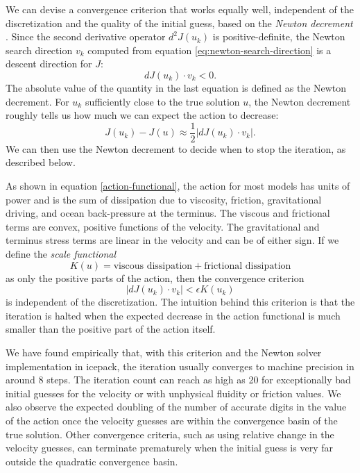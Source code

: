 \documentclass[journal abbreviation, manuscript]{copernicus}
\begin{document}
We can devise a convergence criterion that works equally well, independent of the discretization and the quality of the initial guess, based on the \emph{Newton decrement} \citep{nocedal2006numerical}.
Since the second derivative operator $d^2J(u_k)$ is positive-definite, the Newton search direction $v_k$ computed from equation \eqref{eq:newton-search-direction} is a descent direction for $J$:
\begin{equation}
    dJ(u_k)\cdot v_k < 0.
\end{equation}
The absolute value of the quantity in the last equation is defined as the Newton decrement.
For $u_k$ sufficiently close to the true solution $u$, the Newton decrement roughly tells us how much we can expect the action to decrease:
\begin{equation}
    J(u_k) - J(u) \approx \frac{1}{2}|dJ(u_k)\cdot v_k|.
\end{equation}
We can then use the Newton decrement to decide when to stop the iteration, as described below.

As shown in equation \eqref{action-functional}, the action for most models has units of power and is the sum of dissipation due to viscosity, friction, gravitational driving, and ocean back-pressure at the terminus.
The viscous and frictional terms are convex, positive functions of the velocity.
The gravitational and terminus stress terms are linear in the velocity and can be of either sign.
If we define the \emph{scale functional}
\begin{equation}
    K(u) = \text{viscous dissipation} + \text{frictional dissipation}
\end{equation}
as only the positive parts of the action, then the convergence criterion
\begin{equation}
    |dJ(u_k)\cdot v_k| < \epsilon K(u_k)
\end{equation}
is independent of the discretization.
The intuition behind this criterion is that the iteration is halted when the expected decrease in the action functional is much smaller than the positive part of the action itself.

We have found empirically that, with this criterion and the Newton solver implementation in icepack, the iteration usually converges to machine precision in around 8 steps.
The iteration count can reach as high as 20 for exceptionally bad initial guesses for the velocity or with unphysical fluidity or friction values.
We also observe the expected doubling of the number of accurate digits in the value of the action once the velocity guesses are within the convergence basin of the true solution.
Other convergence criteria, such as using relative change in the velocity guesses, can terminate prematurely when the initial guess is very far outside the quadratic convergence basin.
\end{document}
